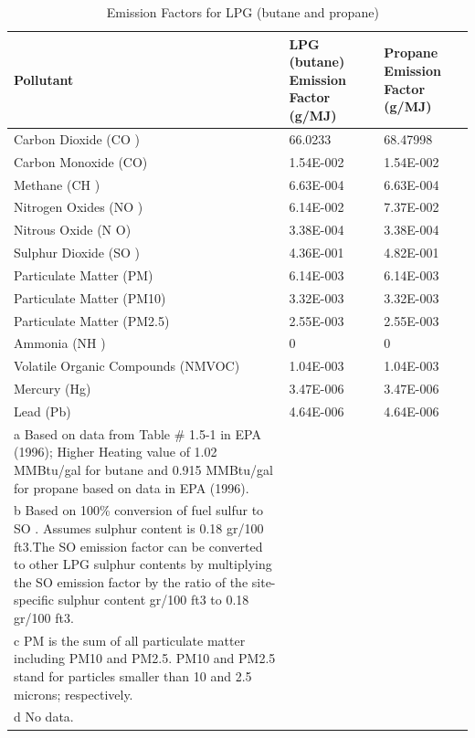 \begin{longtable}[c]{p{3.0in}p{1.5in}p{1.5in}}
\caption{  Emission Factors for LPG (butane and propane) \protect \label{table:emission-factors-for-lpg-butane-and-propane}}\\
\toprule 
Pollutant & LPG (butane) Emission Factor    (g/MJ) & Propane Emission Factor    (g/MJ) \tabularnewline \midrule
\endhead
Carbon Dioxide (CO  ) & 66.0233 & 68.47998 \tabularnewline
Carbon Monoxide (CO) & 1.54E-002 & 1.54E-002 \tabularnewline
Methane (CH  ) & 6.63E-004 & 6.63E-004 \tabularnewline
Nitrogen Oxides (NO  ) & 6.14E-002 & 7.37E-002 \tabularnewline
Nitrous Oxide (N  O) & 3.38E-004 & 3.38E-004 \tabularnewline
Sulphur Dioxide (SO  ) & 4.36E-001 & 4.82E-001 \tabularnewline
Particulate Matter (PM) & 6.14E-003 & 6.14E-003 \tabularnewline
Particulate Matter (PM10) & 3.32E-003 & 3.32E-003 \tabularnewline
Particulate Matter (PM2.5) & 2.55E-003 & 2.55E-003 \tabularnewline
Ammonia (NH  ) & 0 & 0 \tabularnewline
Volatile Organic Compounds (NMVOC) & 1.04E-003 & 1.04E-003 \tabularnewline
Mercury (Hg) & 3.47E-006 & 3.47E-006 \tabularnewline
Lead (Pb) & 4.64E-006 & 4.64E-006 \tabularnewline
a Based on data from Table \# 1.5-1 in EPA (1996); Higher Heating value of 1.02 MMBtu/gal for butane and 0.915 MMBtu/gal for propane based on data in EPA (1996). \tabularnewline
b Based on 100\% conversion of fuel sulfur to SO  . Assumes sulphur content is 0.18 gr/100 ft3.The SO   emission factor can be converted to other LPG sulphur contents by multiplying the SO   emission factor by the ratio of the site-specific sulphur content gr/100 ft3 to 0.18 gr/100 ft3. \tabularnewline
c PM is the sum of all particulate matter including PM10 and PM2.5. PM10 and PM2.5 stand for particles smaller than 10 and 2.5 microns; respectively. \tabularnewline
d No data. \tabularnewline
\bottomrule
\end{longtable}

